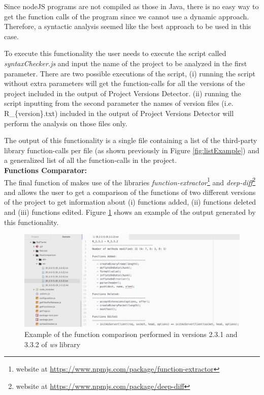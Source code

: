 Since nodeJS programs are not compiled as those in Java, there is no easy way to get the function calls of the program since we cannot use a dynamic approach. Therefore, a syntactic analysis seemed like the best approach to be used in this case.

To execute this functionality the user needs to execute the script called \textit{syntaxChecker.js} and input the name of the project to be analyzed in the first parameter. 
There are two possible executions of the script, 
(i) running the script without extra parameters will get the function-calls for all the versions of the project included in the output of Project Versions Detector. 
(ii) running the script inputting from the second parameter the names of version files (i.e. R\_\{version\}.txt) included in the output of Project Versions Detector will perform the analysis on those files only.

The output of this functionality is a single file containing a list of the third-party library function-calls per file (as shown previously in Figure \ref{fig:listExample}) and a generalized list of all the function-calls in the project.\\

\textbf{Functions Comparator:}\\
The final function of \tool[] makes use of the libraries \textit{function-extractor}\footnote{website at \url{https://www.npmjs.com/package/function-extractor}} and \textit{deep-diff}\footnote{website at \url{https://www.npmjs.com/package/deep-diff}} and allows the user to get a comparison of the functions of two different versions of the project to get information about (i) functions added, (ii) functions deleted and (iii) functions edited. Figure \ref{fig:compExample} shows an example of the output generated by this functionality.

\begin{figure}[ht!]
\centering
\includegraphics[width=1\textwidth]{images/comparison_example.png}
\caption{Example of the function comparison performed in versions 2.3.1 and 3.3.2 of \textit{ws} library}
\label{fig:compExample}
\end{figure}

